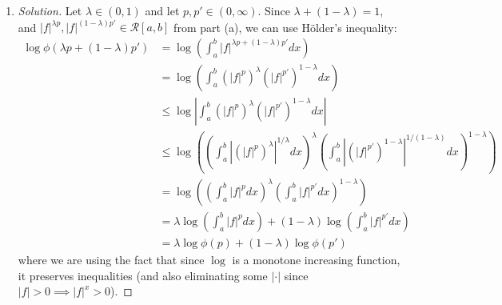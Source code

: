 \documentclass{article}
\newcommand{\N}{{\mathbb N}}
\theoremstyle{remark}
\begin{document}
\begin{enumerate}
\begin{proof}[Solution]
		Hence, if $\lim_{p \to \infty} \lVert f \rVert_p = L<M$,
		there exists $N \in \N$ such that for all $p \geq N$,
		$\lVert f \rVert_p > M - (M-L)/2 > M - (M-L) = L$,
		which is a contradiction.
		This only leaves $\lim_{p \to \infty}\lVert f \rVert_p = M
		= \sup\{|f(x)| \colon x \in [a,b]\}$.
	\end{proof}
	\item \begin{proof}[Solution]\let\qed\relax
		Let $\lambda \in (0,1)$ and let $p,p' \in (0,\infty)$.
		Since $\lambda + (1 - \lambda) = 1$,
		and $|f|^{\lambda p}, |f|^{(1-\lambda)p'} \in \mathcal{R}[a,b]$ from part (a),
		we can use H\"{o}lder's inequality:
		\begin{align*}
			\log\phi(\lambda p + (1-\lambda)p')
			&= \log\left(\int_a^b|f|^{\lambda p + (1-\lambda) p'}dx\right)\\
			&= \log\left(\int_a^b(|f|^p)^\lambda(|f|^{p'})^{1-\lambda}dx\right)\\
			&\leq \log\left\lvert\int_a^b(|f|^p)^\lambda(|f|^{p'})^{1-\lambda}dx\right\rvert\\
			&\leq \log\left(
				\left(\int_a^b\left\lvert(|f|^p)^\lambda\right\rvert^{1/\lambda}
				dx\right)^\lambda
				\left(\int_a^b\left\lvert(|f|^{p'})^{1-\lambda}\right\rvert^{1/(1-\lambda)}
				dx\right)^{1-\lambda}
			\right)\\
			&= \log\left(\left(\int_a^b|f|^pdx\right)^\lambda
			\left(\int_a^b|f|^{p'}dx\right)^{1-\lambda}\right)\\
			&= \lambda\log\left(\int_a^b |f|^pdx\right)
			+ (1 - \lambda)\log\left(\int_a^b |f|^{p'}dx\right)\\
			&= \lambda \log\phi(p) + (1-\lambda)\log\phi(p')
		\end{align*}
		where we are using the fact that since $\log$ is a monotone increasing function,
		it preserves inequalities
		(and also eliminating some $|\cdot|$
		since $|f| > 0 \implies |f|^x > 0$).
	\end{proof}
\end{enumerate}
\end{document}
